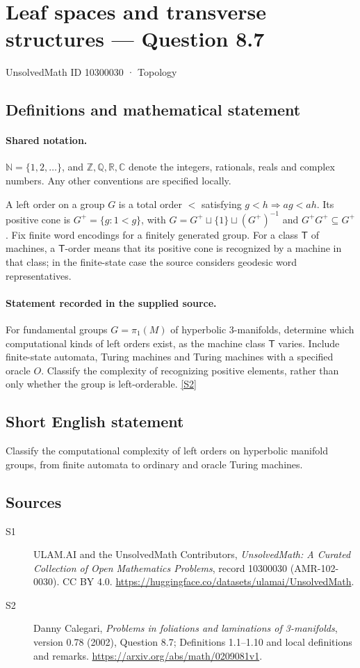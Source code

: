 \documentclass[11pt]{article}
\newcommand{\sref}[2]{\hyperlink{source:#1:#2}{[S#2]}}
\begin{document}
\setcounter{section}{10300029}
\section{Leaf spaces and transverse structures — Question 8.7}\label{10300030}
{\small\sffamily UnsolvedMath ID 10300030 · Topology}
\subsection{Definitions and mathematical statement}

\paragraph{Shared notation.}$\mathbb N=\{1,2,\ldots\}$, and $\mathbb Z,\mathbb Q,\mathbb R,\mathbb C$ denote the integers, rationals, reals and complex numbers. Any other conventions are specified locally.


A left order on a group $G$ is a total order $<$ satisfying $g<h\Rightarrow ag<ah$. Its positive cone is $G^+=\{g:1<g\}$, with $G=G^+\sqcup\{1\}\sqcup(G^+)^{-1}$ and $G^+G^+\subseteq G^+$. Fix finite word encodings for a finitely generated group. For a class $\mathsf T$ of machines, a $\mathsf T$-order means that its positive cone is recognized by a machine in that class; in the finite-state case the source considers geodesic word representatives.
\paragraph{Statement recorded in the supplied source.}
For fundamental groups $G=\pi_1(M)$ of hyperbolic $3$-manifolds, determine which computational kinds of left orders exist, as the machine class $\mathsf T$ varies. Include finite-state automata, Turing machines and Turing machines with a specified oracle $O$. Classify the complexity of recognizing positive elements, rather than only whether the group is left-orderable. \sref{10300030}{2}
\subsection{Short English statement}
Classify the computational complexity of left orders on hyperbolic manifold groups, from finite automata to ordinary and oracle Turing machines.
\subsection{Sources}
\begin{description}
\item[\hypertarget{source:10300030:1}{S1}] ULAM.AI and the UnsolvedMath Contributors, \emph{UnsolvedMath: A Curated Collection of Open Mathematics Problems}, record 10300030 (AMR-102-0030). CC BY 4.0. \url{https://huggingface.co/datasets/ulamai/UnsolvedMath}.
\item[\hypertarget{source:10300030:2}{S2}] Danny Calegari, \emph{Problems in foliations and laminations of 3-manifolds}, version 0.78 (2002), Question 8.7; Definitions 1.1--1.10 and local definitions and remarks. \url{https://arxiv.org/abs/math/0209081v1}.
\end{description}
\label{end:10300030}
\end{document}
